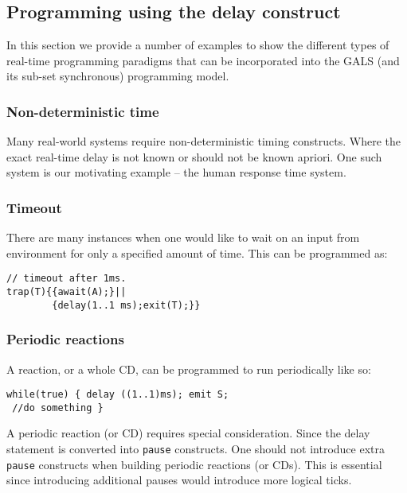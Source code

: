 \subsection{Programming using the delay construct}
\label{sec:progr-using-delay}

In this section we provide a number of examples to show the different
types of real-time programming paradigms that can be incorporated into
the GALS (and its sub-set synchronous) programming model.

\subsubsection{Non-deterministic time}
\label{sec:non-determ-time}

Many real-world systems require non-deterministic timing
constructs. Where the exact real-time delay is not known or should not
be known apriori. One such system is our motivating example -- the human
response time system.

\subsubsection{Timeout}
\label{sec:timeout}

There are many instances when one would like to wait on an input from
environment for only a specified amount of time. This can be programmed
as:
\begin{verbatim}
// timeout after 1ms.
trap(T){{await(A);}||
        {delay(1..1 ms);exit(T);}}
\end{verbatim}

\subsubsection{Periodic reactions}
\label{sec:periodic-reactions}

A reaction, or a whole CD, can be programmed to run periodically like
so:

\begin{verbatim}
while(true) { delay ((1..1)ms); emit S; 
 //do something }
\end{verbatim}
A periodic reaction (or CD) requires special consideration. Since the
delay statement is converted into \texttt{pause} constructs. One should
not introduce extra \texttt{pause} constructs when building periodic
reactions (or CDs). This is essential since introducing additional
pauses would introduce more logical ticks.

